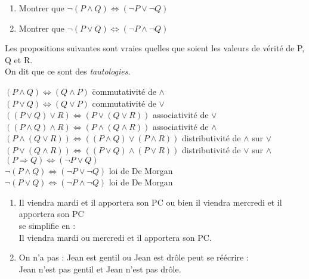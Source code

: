 \documentclass[a4paper,12pt,french]{book}
\begin{document}
\begin{exercice}

	\begin{enumerate}[\bfseries 1.]
		\item 	Montrer que $\neg (P\wedge Q)\Leftrightarrow (\neg P \vee \neg Q)$
		\item 	Montrer que $\neg (P\vee Q)\Leftrightarrow (\neg P \wedge \neg Q)$
	\end{enumerate}
\end{exercice}

\begin{propriete}
	Les propositions suivantes sont vraies quelles que soient les valeurs de vérité de P, Q et R.\\
	On dit que ce sont des \textit{tautologies}.

	\begin{tabbing}
$(P\wedge Q) \Leftrightarrow(Q\wedge P)$ 		\hspace{4cm}	\=commutativité de $\wedge$ \\
$(P\vee Q) \Leftrightarrow(Q\vee P)$ 						 	\>commutativité de $\vee$ \\
$((P\vee Q)\vee R) \Leftrightarrow(P\vee(Q\vee R))$ 			\>associativité de $\vee$ \\
$((P\wedge Q)\wedge R) \Leftrightarrow(P\wedge(Q\wedge R))$ 	\>associativité de $\wedge$ \\
$(P\wedge (Q\vee R))\Leftrightarrow((P\wedge Q)\vee(P\wedge R))$ \>distributivité de $\wedge$ sur $\vee$\\
$(P\vee (Q\wedge R))\Leftrightarrow((P\vee Q)\wedge(P\vee R))$ \>distributivité de $\vee$ sur $\wedge$\\
$(P\Rightarrow Q)\Leftrightarrow(\neg P \vee Q)$\\
$\neg (P\wedge Q)\Leftrightarrow (\neg P \vee \neg Q)$ \> loi de De Morgan\\
$\neg (P\vee Q)\Leftrightarrow (\neg P \wedge \neg Q)$ \> loi de De Morgan\\
	\end{tabbing}
\end{propriete}

\begin{exemple}

\begin{enumerate}[\textbullet]
	\item 	\og Il viendra mardi et il apportera son PC ou bien il viendra mercredi et il apportera son PC\fg{}\\
	se simplifie en :\\	\og Il viendra mardi ou mercredi et il apportera son PC\fg{}.
	\item 	\og On n'a pas :  Jean est gentil ou Jean est drôle\fg{} peut se réécrire :\\
			\og Jean n'est pas gentil et Jean n'est pas drôle\fg{}.
\end{enumerate}
\end{exemple}
\end{document}
